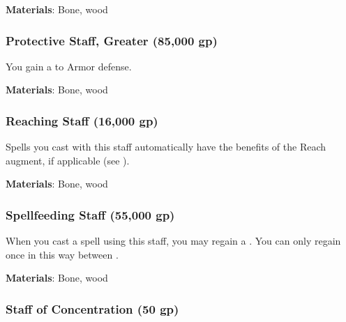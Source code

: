 \vspace{0.25em}
\textbf{Materials}: Bone, wood


\lowercase{\hypertarget{item:Protective Staff, Greater}{}}\label{item:Protective Staff, Greater}
\hypertarget{item:Protective Staff, Greater}{\subsubsection{Protective Staff, Greater\hfill{} (85,000 gp)}}

You gain a   to Armor defense.



\vspace{0.25em}
\textbf{Materials}: Bone, wood


\lowercase{\hypertarget{item:Reaching Staff}{}}\label{item:Reaching Staff}
\hypertarget{item:Reaching Staff}{\subsubsection{Reaching Staff\hfill{} (16,000 gp)}}

Spells you cast with this staff automatically have the benefits of the Reach augment, if applicable (see ).



\vspace{0.25em}
\textbf{Materials}: Bone, wood


\lowercase{\hypertarget{item:Spellfeeding Staff}{}}\label{item:Spellfeeding Staff}
\hypertarget{item:Spellfeeding Staff}{\subsubsection{Spellfeeding Staff\hfill{} (55,000 gp)}}

When you cast a spell using this staff, you may regain a .
You can only regain  once in this way between .



\vspace{0.25em}
\textbf{Materials}: Bone, wood


\lowercase{\hypertarget{item:Staff of Concentration}{}}\label{item:Staff of Concentration}
\hypertarget{item:Staff of Concentration}{\subsubsection{Staff of Concentration\hfill{} (50 gp)}}

